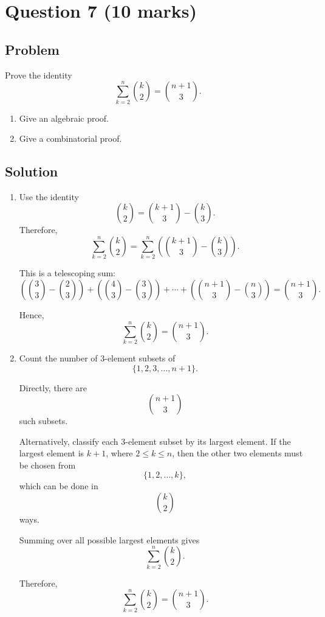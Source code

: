 \documentclass[12pt]{article}
\begin{document}
\newpage
\section{Question 7 \hfill (10 marks)}
\subsection{Problem}

Prove the identity
\[
\sum_{k=2}^{n} \binom{k}{2}=\binom{n+1}{3}.
\]

\begin{enumerate}[label=(\alph*)]
    \item Give an algebraic proof.
    \item Give a combinatorial proof.
\end{enumerate}

\subsection{Solution}

\begin{enumerate}[label=(\alph*)]
    \item Use the identity
    \[
    \binom{k}{2}=\binom{k+1}{3}-\binom{k}{3}.
    \]
    Therefore,
    \[
    \sum_{k=2}^{n} \binom{k}{2}
    =\sum_{k=2}^{n}\left(\binom{k+1}{3}-\binom{k}{3}\right).
    \]

    This is a telescoping sum:
    \[
    \left(\binom{3}{3}-\binom{2}{3}\right)
    +\left(\binom{4}{3}-\binom{3}{3}\right)
    +\cdots+
    \left(\binom{n+1}{3}-\binom{n}{3}\right)
    =\binom{n+1}{3}.
    \]

    Hence,
    \[
    \boxed{\sum_{k=2}^{n} \binom{k}{2}=\binom{n+1}{3}}.
    \]

    \item Count the number of $3$-element subsets of
    \[
    \{1,2,3,\dots,n+1\}.
    \]

    Directly, there are
    \[
    \binom{n+1}{3}
    \]
    such subsets.

    Alternatively, classify each $3$-element subset by its largest element. If the largest element is $k+1$, where $2\le k\le n$, then the other two elements must be chosen from
    \[
    \{1,2,\dots,k\},
    \]
    which can be done in
    \[
    \binom{k}{2}
    \]
    ways.

    Summing over all possible largest elements gives
    \[
    \sum_{k=2}^{n} \binom{k}{2}.
    \]

    Therefore,
    \[
    \boxed{\sum_{k=2}^{n} \binom{k}{2}=\binom{n+1}{3}}.
    \]
\end{enumerate}
\end{document}
